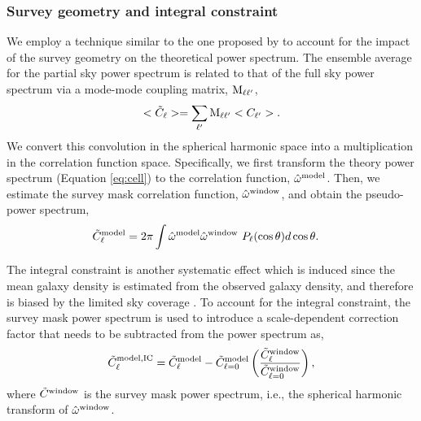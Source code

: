 \subsubsection{Survey geometry and integral constraint}
We employ a technique similar to the one proposed by \cite{chon2004fast} to account for the impact of the survey geometry on the theoretical power spectrum. The ensemble average for the partial sky power spectrum is related to that of the full sky power spectrum via a mode-mode coupling matrix, ${\rm M}_{\ell \ell^{\prime}}$,
\begin{equation}\label{eq:mixm}
    <\tilde{C}_{\ell}> = \sum_{\ell^{\prime}} {\rm M}_{\ell \ell^{\prime}}<C_{\ell^{\prime}}>.
\end{equation}
We convert this convolution in the spherical harmonic space into a multiplication in the correlation function space. Specifically, we first transform the theory power spectrum (Equation \ref{eq:cell}) to the correlation function, $\hat{\omega}^{\rm model}$. Then, we estimate the survey mask correlation function, $\hat{\omega}^{\rm window}$, and obtain the pseudo-power spectrum,
\begin{align}
    \tilde{C}^{\rm model}_{\ell} &= 2\pi \int \hat{\omega}^{\rm model}\hat{\omega}^{\rm window}~P_{\ell}(\cos\theta) d\cos\theta.
\end{align}

The integral constraint is another systematic effect which is induced since the mean galaxy density is estimated from the observed galaxy density, and therefore is biased by the limited sky coverage \citep{peacock1991large}. To account for the integral constraint, the survey mask power spectrum is used to introduce a scale-dependent correction factor that needs to be subtracted from the power spectrum as,
\begin{equation}
     \tilde{C}^{\rm model, IC}_{\ell} = \tilde{C}^{\rm model}_{\ell} - \tilde{C}^{\rm model}_{\ell=0} \left(\frac{\tilde{C}^{\rm window}_{\ell}}{\tilde{C}^{\rm window}_{\ell=0}}\right),
\end{equation}
where $\tilde{C}^{\rm window}$ is the survey mask power spectrum, i.e., the spherical harmonic transform of $\hat{\omega}^{\rm window}$.

